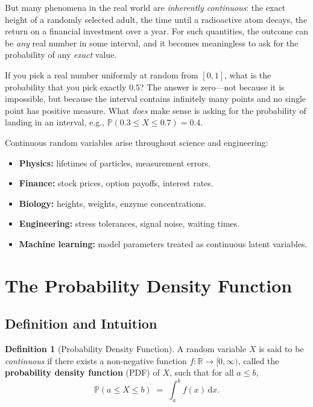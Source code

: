 \documentclass[12pt, a4paper, oneside]{book}
\theoremstyle{definition}
\newtheorem{definition}{Definition}[section]
\theoremstyle{plain}
\theoremstyle{remark}
\newcommand{\Prob}{\mathbb{P}}
\newcommand{\R}{\mathbb{R}}
\begin{document}
But many phenomena in the real world are \emph{inherently continuous}: the
exact height of a randomly selected adult, the time until a radioactive atom
decays, the return on a financial investment over a year.  For such
quantities, the outcome can be \emph{any} real number in some interval, and
it becomes meaningless to ask for the probability of any \emph{exact} value.

\begin{intuition}
If you pick a real number uniformly at random from $[0,1]$, what is the
probability that you pick exactly $0.5$?  The answer is zero---not because
it is impossible, but because the interval contains infinitely many points
and no single point has positive measure.  What \emph{does} make sense is
asking for the probability of landing in an interval, e.g.,
$\Prob(0.3 \le X \le 0.7) = 0.4$.
\end{intuition}

Continuous random variables arise throughout science and engineering:
\begin{itemize}[leftmargin=2em]
  \item \textbf{Physics:} lifetimes of particles, measurement errors.
  \item \textbf{Finance:} stock prices, option payoffs, interest rates.
  \item \textbf{Biology:} heights, weights, enzyme concentrations.
  \item \textbf{Engineering:} stress tolerances, signal noise, waiting times.
  \item \textbf{Machine learning:} model parameters treated as continuous
        latent variables.
\end{itemize}

\section{The Probability Density Function}
\label{sec:pdf}

\subsection{Definition and Intuition}

\begin{definition}[Probability Density Function]
A random variable $X$ is said to be \emph{continuous} if there exists a
non-negative function $f:\R\to[0,\infty)$, called the
\textbf{probability density function} (PDF) of $X$, such that for all
$a \le b$,
\[
  \Prob(a \le X \le b) \;=\; \int_a^b f(x)\,\mathrm{d}x.
\]
\end{definition}
\end{document}
